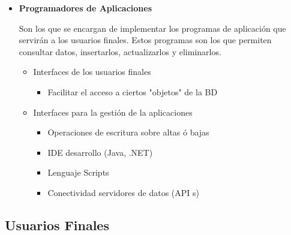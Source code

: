 \documentclass[12pt, fleqn]{report}                             %
\theoremstyle{break}                                            %
\begin{document}
\begin{itemize}
                \item
                    \textbf{Programadores de Aplicaciones}

                    Son los que se encargan de implementar los programas de aplicación que
                    servirán a los usuarios finales. Estos programas son los que permiten
                    consultar datos, insertarlos, actualizarlos y eliminarlos.

                    \begin{itemize}
                        \item Interfaces de los usuarios finales
                        \begin{itemize}
                            \item Facilitar el acceso a ciertos "objetos" de la BD
                        \end{itemize}

                        \item Interfaces para la gestión de la aplicaciones 
                        \begin{itemize}
                            \item Operaciones de escritura sobre altas ó bajas 
                            \item IDE desarrollo (Java, .NET)
                            \item Lenguaje Scripts
                            \item Conectividad servidores de datos (API s) 
                        \end{itemize}
        
                    \end{itemize}


            \end{itemize}


            \clearpage
            \subsection{Usuarios Finales}
\end{document}

